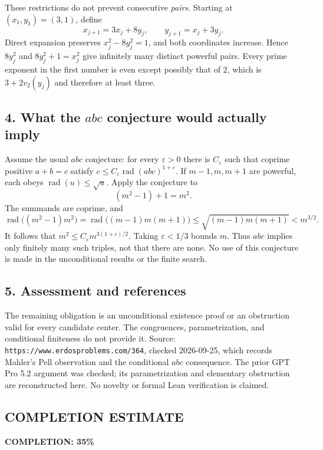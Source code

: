 These restrictions do not prevent consecutive \emph{pairs}.
Starting at $(x_1,y_1)=(3,1)$, define
\[
 x_{j+1}=3x_j+8y_j,\qquad y_{j+1}=x_j+3y_j.
\]
Direct expansion preserves $x_j^2-8y_j^2=1$, and both coordinates
increase. Hence $8y_j^2$ and $8y_j^2+1=x_j^2$ give infinitely many
distinct powerful pairs. Every prime exponent in the first number
is even except possibly that of $2$, which is $3+2v_2(y_j)$ and
therefore at least three.

\subsection*{4. What the $abc$ conjecture would actually imply}
Assume the usual $abc$ conjecture: for every $\varepsilon>0$ there is
$C_\varepsilon$ such that coprime positive $a+b=c$ satisfy
$c\le C_\varepsilon\operatorname{rad}(abc)^{1+\varepsilon}$.
If $m-1,m,m+1$ are powerful, each obeys
$\operatorname{rad}(u)\le\sqrt u$. Apply the conjecture to
\[
 (m^2-1)+1=m^2.
\]
The summands are coprime, and
\[
 \operatorname{rad}\big((m^2-1)m^2\big)
 =\operatorname{rad}\big((m-1)m(m+1)\big)
 \le\sqrt{(m-1)m(m+1)}<m^{3/2}.
\]
It follows that $m^2\le C_\varepsilon m^{3(1+\varepsilon)/2}$.
Taking $\varepsilon<1/3$ bounds $m$.
Thus $abc$ implies only finitely many such triples, not that there
are none. No use of this conjecture is made in the unconditional
results or the finite search.

\subsection*{5. Assessment and references}
The remaining obligation is an unconditional existence proof or an
obstruction valid for every candidate center. The congruences,
parametrization, and conditional finiteness do not provide it.
Source: \texttt{https://www.erdosproblems.com/364}, checked 2026-09-25,
which records Mahler's Pell observation and the conditional $abc$
consequence. The prior GPT Pro 5.2 argument was checked; its
parametrization and elementary obstruction are reconstructed here.
No novelty or formal Lean verification is claimed.
\subsection*{COMPLETION ESTIMATE}
\textbf{COMPLETION: 35\%}
